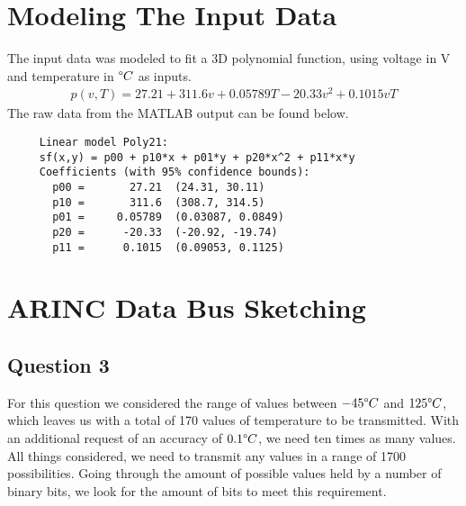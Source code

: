 \documentclass[english,palatino]{ist-report}
\begin{document}
\section{Modeling The Input Data}

The input data was modeled to fit a 3D polynomial function, using voltage in \si{\volt} and temperature in $\degree C$ as inputs.
\begin{gather*}
	p(v,T) = 27.21 + 311.6v + 0.05789T - 20.33v^2 + 0.1015vT
\end{gather*}
The raw data from the MATLAB output can be found below.  
\begin{verbatim}
     Linear model Poly21:
     sf(x,y) = p00 + p10*x + p01*y + p20*x^2 + p11*x*y
     Coefficients (with 95% confidence bounds):
       p00 =       27.21  (24.31, 30.11)
       p10 =       311.6  (308.7, 314.5)
       p01 =     0.05789  (0.03087, 0.0849)
       p20 =      -20.33  (-20.92, -19.74)
       p11 =      0.1015  (0.09053, 0.1125)
\end{verbatim}

\section{ARINC Data Bus Sketching}



\subsection{Question 3}

For this question we considered the range of values between $\num{-45}\degree C$ and $\num{125}\degree C$, which leaves us with a total of 170 values of temperature to be transmitted. With an additional request of an accuracy of $\num{0.1}\degree C$, we need ten times as many values. All things considered, we need to transmit any values in a range of 1700 possibilities. Going through the amount of possible values held by a number of binary bits, we look for the amount of bits to meet this requirement.
\end{document}
